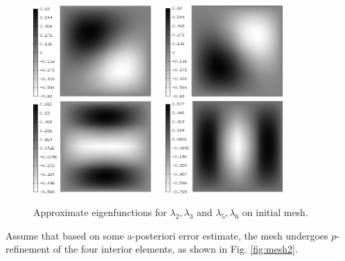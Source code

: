 \documentclass[preprint,12pt]{elsarticle}
\begin{document}
\begin{figure}[!ht]
\begin{center}
\includegraphics[width=0.4\textwidth]{img/eigen_1.png}\ \ \ 
\includegraphics[width=0.4\textwidth]{img/eigen_2.png}\\[4mm]
\includegraphics[width=0.4\textwidth]{img/eigen_3.png}\ \ \ 
\includegraphics[width=0.4\textwidth]{img/eigen_4.png}\\
\end{center}
\vspace{-5mm}
\caption{Approximate eigenfunctions for $\lambda_2, \lambda_3$ and 
$\lambda_5, \lambda_6$ on initial mesh.}
\label{fig:eigen1}
\end{figure}

Assume that based on some a-posteriori error estimate, the mesh undergoes 
$p$-refinement of the four interior elements, as shown in Fig. \ref{fig:mesh2}.
\end{document}
